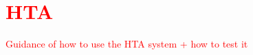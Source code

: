 \chapter{\textcolor{red}{HTA}}
\textcolor{red}{Guidance of how to use the HTA system + how to test it}
